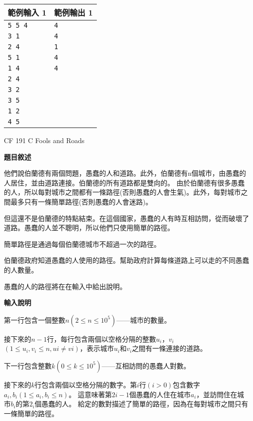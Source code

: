     \begin{tabular}{|m{7cm}|m{7cm}|}
        \hline
        範例輸入 1 & 範例輸出 1 \\
        \hline
        \verb|5 5 4|  & \verb|4| \\
        \verb|3 1|  & \verb|4| \\
        \verb|2 4|  & \verb|1| \\
        \verb|5 1|  & \verb|4| \\
        \verb|1 4|  & \verb|4| \\
        \verb|2 4| & \\
        \verb|3 2|  & \\
        \verb|3 5|  & \\
        \verb|1 2|  & \\
        \verb|4 5|  & \\
        \hline
    \end{tabular}

    \problem CF 191 C Fools and Roads

    \textbf{題目敘述}

    他們說伯蘭德有兩個問題，愚蠢的人和道路。此外，伯蘭德有n個城市，由愚蠢的人居住，並由道路連接。伯蘭德的所有道路都是雙向的。
    由於伯蘭德有很多愚蠢的人，所以每對城市之間都有一條路徑(否則愚蠢的人會生氣)。此外，每對城市之間最多只有一條簡單路徑(否則愚蠢的人會迷路)。

    但這還不是伯蘭德的特點結束。在這個國家，愚蠢的人有時互相訪問，從而破壞了道路。愚蠢的人並不聰明，所以他們只使用簡單的路徑。

    簡單路徑是通過每個伯蘭德城市不超過一次的路徑。

    伯蘭德政府知道愚蠢的人使用的路徑。幫助政府計算每條道路上可以走的不同愚蠢的人數量。

    愚蠢的人的路徑將在在輸入中給出說明。

    \textbf{輸入說明}

    第一行包含一個整數$n(2 \le n \le 10^5)$——城市的數量。

    接下來的$n-1$行，每行包含兩個以空格分隔的整數$u_i$，$v_i$ $(1 \le u_i,v_i \le n,ui \ne vi)$，表示城市$u_i$和$v_i$之間有一條連接的道路。

    下一行包含整數$k(0 \le k \le 10^5)$——互相訪問的愚蠢人對數。

    接下來的$k$行包含兩個以空格分隔的數字。第$i$行$(i>0)$包含數字$a_i,b_i(1 \le a_i,b_i \le n)$。
    這意味著第$2i-1$個愚蠢的人住在城市$a_i$，並訪問住在城市$b_i$的第$2_i$個愚蠢的人。
    給定的數對描述了簡單的路徑，因為在每對城市之間只有一條簡單的路徑。
    
